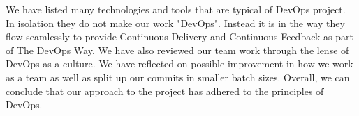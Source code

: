 \documentclass{article}
\begin{document}
We have listed many technologies and tools that are typical of DevOps project. In isolation they do not make our work "DevOps". Instead it is in the way they flow seamlessly to provide Continuous Delivery and Continuous Feedback as part of The DevOps Way. We have also reviewed our team work through the lense of DevOps as a culture. We have reflected on possible improvement in how we work as a team as well as split up our commits in smaller batch sizes. Overall, we can conclude that our approach to the project has adhered to the principles of DevOps. 



\end{document}
